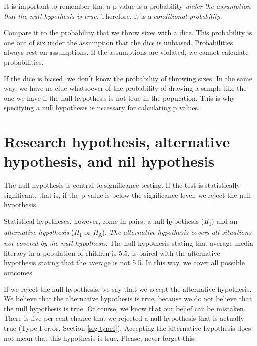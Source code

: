 \documentclass[a4paper]{book}
\theoremstyle{definition}
\theoremstyle{definition}
\theoremstyle{definition}
\theoremstyle{remark}
\begin{document}
It is important to remember that a p value is a probability \emph{under
the assumption that the null hypothesis is true}. Therefore, it is a
\emph{conditional probability}.

Compare it to the probability that we throw sixes with a dice. This
probability is one out of six under the assumption that the dice is
unbiased. Probabilities always rest on assumptions. If the assumptions
are violated, we cannot calculate probabilities.

If the dice is biased, we don't know the probability of throwing sixes.
In the same way, we have no clue whatsoever of the probability of
drawing a sample like the one we have if the null hypothesis is not true
in the population. This is why specifying a null hypothesis is necessary
for calculating p values.

\section{Research hypothesis, alternative hypothesis, and nil
hypothesis}\label{null-alt}

The null hypothesis is central to significance testing. If the test is
statistically significant, that is, if the p value is below the
significance level, we reject the null hypothesis.

Statistical hypotheses, however, come in pairs: a null hypothesis
(\emph{H}\textsubscript{0}) and an \emph{alternative hypothesis}
(\emph{H}\textsubscript{1} or \emph{H}\textsubscript{A}). \emph{The
alternative hypothesis covers all situations not covered by the null
hypothesis}. The null hypothesis stating that average media literacy in
a population of children is 5.5, is paired with the alternative
hypothesis stating that the average is not 5.5. In this way, we cover
all possible outcomes.

If we reject the null hypothesis, we say that we accept the alternative
hypothesis. We believe that the alternative hypothesis is true, because
we do not believe that the null hypothesis is true. Of course, we know
that our belief can be mistaken. There is five per cent chance that we
rejected a null hypothesis that is actually true (Type I error, Section
\ref{sig-typeI}). Accepting the alternative hypothesis does not mean
that this hypothesis is true. Please, never forget this.
\end{document}
